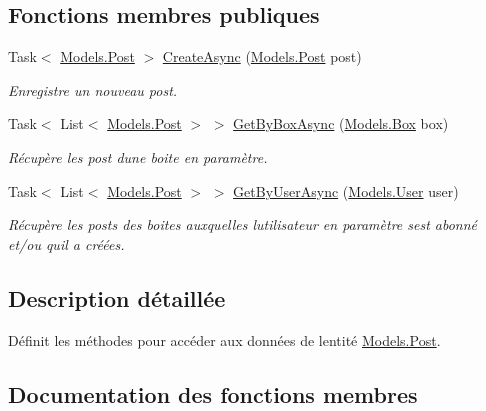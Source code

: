 \subsection*{Fonctions membres publiques}
\begin{DoxyCompactItemize}
\item 
Task$<$ \hyperlink{class_boxes_1_1_models_1_1_post}{Models.\+Post} $>$ \hyperlink{interface_boxes_1_1_services_1_1_post_1_1_i_post_service_a4ba485f8a097660c10ababae89b7e418}{Create\+Async} (\hyperlink{class_boxes_1_1_models_1_1_post}{Models.\+Post} post)
\begin{DoxyCompactList}\small\item\em Enregistre un nouveau post. \end{DoxyCompactList}\item 
Task$<$ List$<$ \hyperlink{class_boxes_1_1_models_1_1_post}{Models.\+Post} $>$ $>$ \hyperlink{interface_boxes_1_1_services_1_1_post_1_1_i_post_service_a70b3b6831547dadf5069a25bcdf2c97c}{Get\+By\+Box\+Async} (\hyperlink{class_boxes_1_1_models_1_1_box}{Models.\+Box} box)
\begin{DoxyCompactList}\small\item\em Récupère les post d\textquotesingle{}une boite en paramètre. \end{DoxyCompactList}\item 
Task$<$ List$<$ \hyperlink{class_boxes_1_1_models_1_1_post}{Models.\+Post} $>$ $>$ \hyperlink{interface_boxes_1_1_services_1_1_post_1_1_i_post_service_adb0e10d59b98f1b2b62e6ce456a59d9b}{Get\+By\+User\+Async} (\hyperlink{class_boxes_1_1_models_1_1_user}{Models.\+User} user)
\begin{DoxyCompactList}\small\item\em Récupère les posts des boites auxquelles l\textquotesingle{}utilisateur en paramètre s\textquotesingle{}est abonné et/ou qu\textquotesingle{}il a créées. \end{DoxyCompactList}\end{DoxyCompactItemize}


\subsection{Description détaillée}
Définit les méthodes pour accéder aux données de l\textquotesingle{}entité \hyperlink{class_boxes_1_1_models_1_1_post}{Models.\+Post}. 



\subsection{Documentation des fonctions membres}
